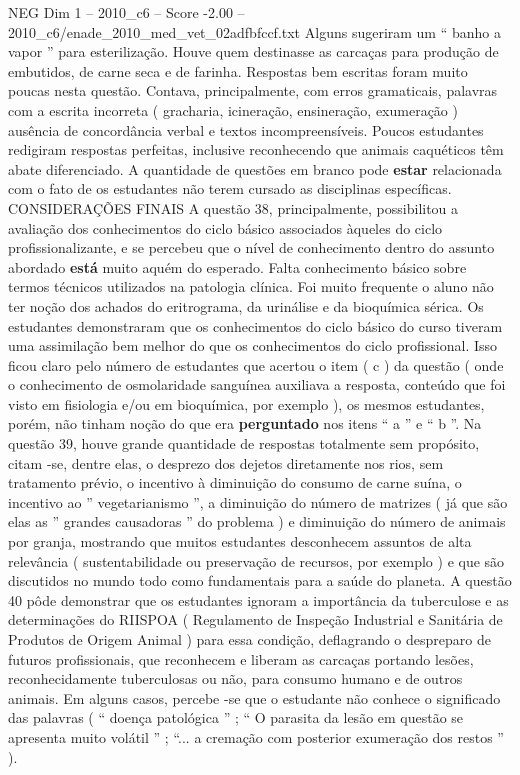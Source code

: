 \begin{textsample}{NEG Dim 1 – 2010\_c6 – Score -2.00 – 2010\_c6/enade\_2010\_med\_vet\_02adfbfccf.txt}
Alguns sugeriram um “ banho a vapor ” para esterilização.
Houve quem destinasse as carcaças para produção de embutidos, de carne seca e de farinha.
Respostas bem escritas foram muito poucas nesta questão.
Contava, principalmente, com erros gramaticais, palavras com a escrita incorreta ( gracharia, icineração, ensineração, exumeração ) ausência de concordância verbal e textos incompreensíveis.
Poucos estudantes redigiram respostas perfeitas, inclusive reconhecendo que animais caquéticos têm abate diferenciado.
A quantidade de questões em branco pode \textbf{estar} relacionada com o fato de os estudantes não terem cursado as disciplinas específicas.
CONSIDERAÇÕES FINAIS A questão 38, principalmente, possibilitou a avaliação dos conhecimentos do ciclo básico associados àqueles do ciclo profissionalizante, e se percebeu que o nível de conhecimento dentro do assunto abordado \textbf{está} muito aquém do esperado.
Falta conhecimento básico sobre termos técnicos utilizados na patologia clínica.
Foi muito frequente o aluno não ter noção dos achados do eritrograma, da urinálise e da bioquímica sérica.
Os estudantes demonstraram que os conhecimentos do ciclo básico do curso tiveram uma assimilação bem melhor do que os conhecimentos do ciclo profissional.
Isso ficou claro pelo número de estudantes que acertou o item ( c ) da questão ( onde o conhecimento de osmolaridade sanguínea auxiliava a resposta, conteúdo que foi visto em fisiologia e/ou em bioquímica, por exemplo ), os mesmos estudantes, porém, não tinham noção do que era \textbf{perguntado} nos itens “ a ” e “ b ”.
Na questão 39, houve grande quantidade de respostas totalmente sem propósito, citam -se, dentre elas, o desprezo dos dejetos diretamente nos rios, sem tratamento prévio, o incentivo à diminuição do consumo de carne suína, o incentivo ao ” vegetarianismo ”, a diminuição do número de matrizes ( já que são elas as ” grandes causadoras ” do problema ) e diminuição do número de animais por granja, mostrando que muitos estudantes desconhecem assuntos de alta relevância ( sustentabilidade ou preservação de recursos, por exemplo ) e que são discutidos no mundo todo como fundamentais para a saúde do planeta.
A questão 40 pôde demonstrar que os estudantes ignoram a importância da tuberculose e as determinações do RIISPOA ( Regulamento de Inspeção Industrial e Sanitária de Produtos de Origem Animal ) para essa condição, deflagrando o despreparo de futuros profissionais, que reconhecem e liberam as carcaças portando lesões, reconhecidamente tuberculosas ou não, para consumo humano e de outros animais.
Em alguns casos, percebe -se que o estudante não conhece o significado das palavras ( “ doença patológica ” ; “ O parasita da lesão em questão se apresenta muito volátil ” ; “... a cremação com posterior exumeração dos restos ” ).

\end{textsample}
